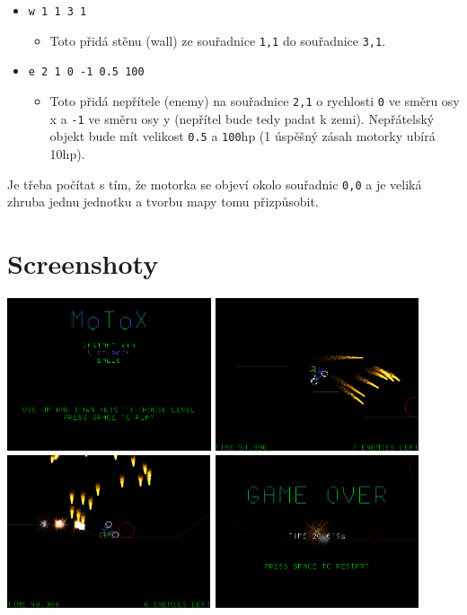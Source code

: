 \documentclass{article}
\begin{document}
\begin{itemize}
\item \texttt{w 1 1 3 1}
\begin{itemize}
\item Toto přidá stěnu (wall) ze souřadnice \texttt{1,1} do souřadnice \texttt{3,1}.
\end{itemize}
\item \texttt{e 2 1 0 -1 0.5 100}
\begin{itemize}
\item Toto přidá nepřítele (enemy) na souřadnice \texttt{2,1} o rychlosti \texttt{0} ve směru osy x a \texttt{-1} ve směru osy y (nepřítel bude tedy padat k zemi). Nepřátelský objekt bude mít velikost \texttt{0.5} a \texttt{100}hp (1 úspěšný zásah motorky ubírá 10hp).
\end{itemize}
\end{itemize}

Je třeba počítat s tím, že motorka se objeví okolo souřadnic \texttt{0,0} a je veliká zhruba jednu jednotku a tvorbu mapy tomu přizpůsobit.

\section{Screenshoty}
\includegraphics[width=6cm,height=4.5cm]{menu.png}
\includegraphics[width=6cm,height=4.5cm]{jump.png}
\includegraphics[width=6cm,height=4.5cm]{napalm_rain.png}
\includegraphics[width=6cm,height=4.5cm]{game_over.png}
\end{document}
